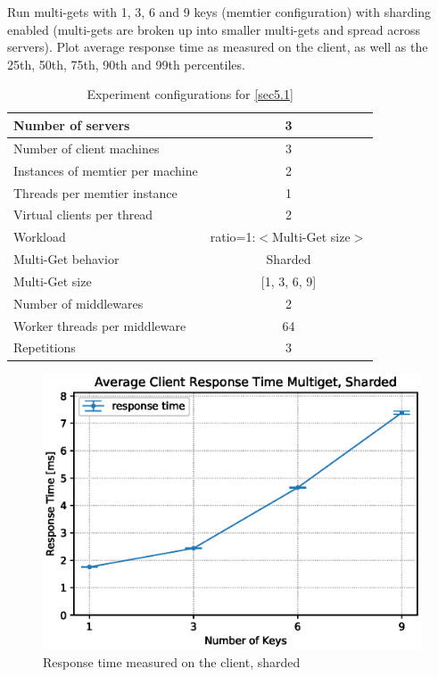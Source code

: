 \documentclass[11pt,a4paper]{article}
\begin{document}
Run multi-gets with 1, 3, 6 and 9 keys (memtier configuration) with sharding enabled (multi-gets are broken up into smaller multi-gets and spread across servers). Plot average response time as measured on the client, as well as the 25th, 50th, 75th, 90th and 99th percentiles.

\begin{center}
    \begin{table}
        \centering
    	\begin{tabular}{|l|c|}
    		\hline Number of servers                & 3                       \\ 
    		\hline Number of client machines        & 3                       \\ 
    		\hline Instances of memtier per machine & 2                       \\ 
    		\hline Threads per memtier instance     & 1                       \\
    		\hline Virtual clients per thread       & 2     		            \\ 
    		\hline Workload                         & ratio=1:$<$Multi-Get size$>$             \\
    		\hline Multi-Get behavior               & Sharded                 \\
    		\hline Multi-Get size                   & [1, 3, 6, 9]            \\
    		\hline Number of middlewares            & 2                       \\
    		\hline Worker threads per middleware    & 64                      \\
    		\hline Repetitions                      & 3                       \\ 
    		\hline 
    	\end{tabular}
    	\caption{Experiment configurations for \autoref{sec5.1}} \label{exp5-1}
    \end{table}
\end{center}

\begin{figure}
    \centering
    \includegraphics[width=0.7\linewidth]{plots/5a_latencyMemtier.eps}
    \caption{Response time measured on the client, sharded}
    \label{fig:5-1-responsetime}
\end{figure}
\end{document}
